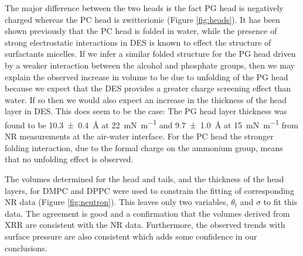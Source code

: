 \documentclass[twocolumn,a4paper]{paper}
\begin{document}
The major difference between the two heads is the fact PG head is negatively charged whereas the PC head is zwitterionic (Figure \ref{fig:heads}).
It has been shown previously that the PC head is folded in water\cite{Gilliams2016}, while the presence of strong electrostatic interactions in DES is known to effect the structure of surfactants micelles\cite{Sanchez-Fernandez2018}.
If we infer a similar folded structure for the PG head driven by a weaker interaction between the alcohol and phosphate groups, then we may explain the observed increase in volume to be due to unfolding of the PG head because we expect that the DES provides a greater charge screening effect than water.
If so then we would also expect an increase in the thickness of the head layer in DES. This does seem to be the case: The PG head layer thickness was found to be \SI[separate-uncertainty=true]{10.3\pm0.4}{\angstrom} at \SI{22}{\milli\newton\per\meter} \cite{Clifton2012} and \SI[separate-uncertainty=true]{9.7\pm1.0}{\angstrom} at \SI{15}{\milli\newton\per\meter} \cite{Ciumac2017} from NR measurements at the air-water interface.
For the PC head the stronger folding interaction, due to the formal charge on the ammonium group, means that no unfolding effect is observed.

The volumes determined for the head and tails, and the thickness of the head layers, for DMPC and DPPC were used to constrain the fitting of corresponding NR data (Figure \ref{fig:neutron}). This leaves only two variables, $\theta_t$ and $\sigma$ to fit this data.
The agreement is good and a confirmation that the volumes derived from XRR are consistent with the NR data.
Furthermore, the observed trends with surface pressure are also consistent which adds some confidence in our conclusions.
\end{document}
